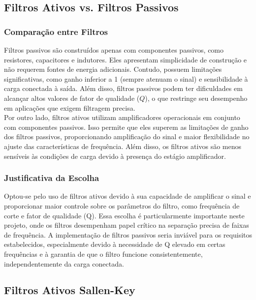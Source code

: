 \documentclass[a4paper, 12pt]{article}
\begin{document}
\subsection{Filtros Ativos vs. Filtros Passivos}
\subsubsection{Comparação entre Filtros}

Filtros passivos são construídos apenas com componentes passivos, como resistores, capacitores e indutores. Eles apresentam simplicidade de construção e não requerem fontes de energia adicionais. Contudo, possuem limitações significativas, como ganho inferior a 1 (sempre atenuam o sinal) e sensibilidade à carga conectada à saída. Além disso, filtros passivos podem ter dificuldades em alcançar altos valores de fator de qualidade ($Q$), o que restringe seu desempenho em aplicações que exigem filtragem precisa.\\

Por outro lado, filtros ativos utilizam amplificadores operacionais em conjunto com componentes passivos. Isso permite que eles superem as limitações de ganho dos filtros passivos, proporcionando amplificação do sinal e maior flexibilidade no ajuste das características de frequência. Além disso, os filtros ativos são menos sensíveis às condições de carga devido à presença do estágio amplificador.

\subsubsection{Justificativa da Escolha}

Optou-se pelo uso de filtros ativos devido à sua capacidade de amplificar o sinal e proporcionar maior controle sobre os parâmetros do filtro, como frequência de corte e fator de qualidade (Q). Essa escolha é particularmente importante neste projeto, onde os filtros desempenham papel crítico na separação precisa de faixas de frequência. A implementação de filtros passivos seria inviável para os requisitos estabelecidos, especialmente devido à necessidade de Q elevado em certas frequências e à garantia de que o filtro funcione consistentemente, independentemente da carga conectada.

\subsection{Filtros Ativos Sallen-Key}
\end{document}
